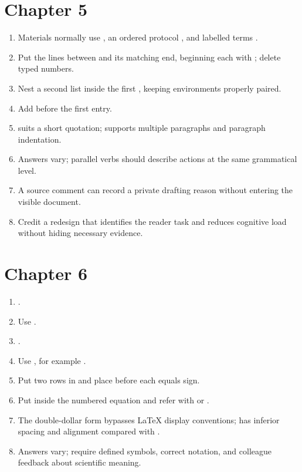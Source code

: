 \section*{Chapter 5}
\begin{enumerate}[label=5.\arabic*,leftmargin=2.4em,itemsep=0.45em]
  \item Materials normally use , an ordered protocol
        , and labelled terms .
  \item Put the lines between  and its matching
        end, beginning each with ; delete typed numbers.
  \item Nest a second list inside the first , keeping environments
        properly paired.
  \item Add  before the first entry.
  \item {} suits a short quotation;  supports multiple
        paragraphs and paragraph indentation.
  \item Answers vary; parallel verbs should describe actions at the same
        grammatical level.
  \item A source comment can record a private drafting reason without entering
        the visible document.
  \item Credit a redesign that identifies the reader task and reduces cognitive
        load without hiding necessary evidence.
\end{enumerate}

\section*{Chapter 6}
\begin{enumerate}[label=6.\arabic*,leftmargin=2.4em,itemsep=0.45em]
  \item {}.
  \item Use .
  \item {}.
  \item Use , for example .
  \item Put two rows in  and place \code{\&} before each equals sign.
  \item Put  inside the numbered equation and refer
        with  or .
  \item The double-dollar form bypasses \LaTeX{} display conventions; 
        has inferior spacing and alignment compared with .
  \item Answers vary; require defined symbols, correct notation, and colleague
        feedback about scientific meaning.
\end{enumerate}

